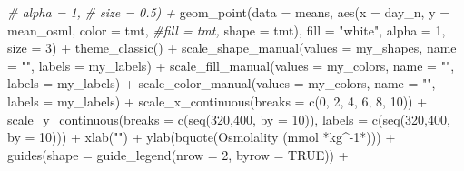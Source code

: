 \documentclass[
]{article}
\newenvironment{Shaded}{\begin{snugshade}}{\end{snugshade}}
\newcommand{\AttributeTok}[1]{\textcolor[rgb]{0.77,0.63,0.00}{#1}}
\newcommand{\CommentTok}[1]{\textcolor[rgb]{0.56,0.35,0.01}{\textit{#1}}}
\newcommand{\ConstantTok}[1]{\textcolor[rgb]{0.00,0.00,0.00}{#1}}
\newcommand{\DecValTok}[1]{\textcolor[rgb]{0.00,0.00,0.81}{#1}}
\newcommand{\FunctionTok}[1]{\textcolor[rgb]{0.00,0.00,0.00}{#1}}
\newcommand{\NormalTok}[1]{#1}
\newcommand{\SpecialCharTok}[1]{\textcolor[rgb]{0.00,0.00,0.00}{#1}}
\newcommand{\StringTok}[1]{\textcolor[rgb]{0.31,0.60,0.02}{#1}}
\begin{document}
\begin{Shaded}
\begin{Highlighting}[]
        \CommentTok{\#    alpha = 1, }
         \CommentTok{\#   size = 0.5) +}
  \FunctionTok{geom\_point}\NormalTok{(}\AttributeTok{data =}\NormalTok{ means,}
            \FunctionTok{aes}\NormalTok{(}\AttributeTok{x =}\NormalTok{ day\_n,}
                \AttributeTok{y =}\NormalTok{ mean\_osml, }
                \AttributeTok{color =}\NormalTok{ tmt,}
                \CommentTok{\#fill = tmt,}
                \AttributeTok{shape =}\NormalTok{ tmt),}
            \AttributeTok{fill =} \StringTok{"white"}\NormalTok{,}
            \AttributeTok{alpha =} \DecValTok{1}\NormalTok{, }
            \AttributeTok{size =} \DecValTok{3}\NormalTok{) }\SpecialCharTok{+}
  \FunctionTok{theme\_classic}\NormalTok{() }\SpecialCharTok{+} 
  \FunctionTok{scale\_shape\_manual}\NormalTok{(}\AttributeTok{values =}\NormalTok{ my\_shapes, }\AttributeTok{name =} \StringTok{""}\NormalTok{,}
                     \AttributeTok{labels =}\NormalTok{ my\_labels) }\SpecialCharTok{+}
  \FunctionTok{scale\_fill\_manual}\NormalTok{(}\AttributeTok{values =}\NormalTok{ my\_colors, }\AttributeTok{name =} \StringTok{""}\NormalTok{,}
                     \AttributeTok{labels =}\NormalTok{ my\_labels) }\SpecialCharTok{+}
  \FunctionTok{scale\_color\_manual}\NormalTok{(}\AttributeTok{values =}\NormalTok{ my\_colors, }\AttributeTok{name =} \StringTok{""}\NormalTok{,}
                     \AttributeTok{labels =}\NormalTok{ my\_labels) }\SpecialCharTok{+}
  \FunctionTok{scale\_x\_continuous}\NormalTok{(}\AttributeTok{breaks =} \FunctionTok{c}\NormalTok{(}\DecValTok{0}\NormalTok{, }\DecValTok{2}\NormalTok{, }\DecValTok{4}\NormalTok{, }\DecValTok{6}\NormalTok{, }\DecValTok{8}\NormalTok{, }\DecValTok{10}\NormalTok{)) }\SpecialCharTok{+}
  \FunctionTok{scale\_y\_continuous}\NormalTok{(}\AttributeTok{breaks =} \FunctionTok{c}\NormalTok{(}\FunctionTok{seq}\NormalTok{(}\DecValTok{320}\NormalTok{,}\DecValTok{400}\NormalTok{, }\AttributeTok{by =} \DecValTok{10}\NormalTok{)),}
                     \AttributeTok{labels =} \FunctionTok{c}\NormalTok{(}\FunctionTok{seq}\NormalTok{(}\DecValTok{320}\NormalTok{,}\DecValTok{400}\NormalTok{, }\AttributeTok{by =} \DecValTok{10}\NormalTok{))) }\SpecialCharTok{+}
  \FunctionTok{xlab}\NormalTok{(}\StringTok{""}\NormalTok{) }\SpecialCharTok{+} 
  \FunctionTok{ylab}\NormalTok{(}\FunctionTok{bquote}\NormalTok{(}\StringTok{\textquotesingle{}Osmolality (mmol \textquotesingle{}}\SpecialCharTok{*}\NormalTok{kg}\SpecialCharTok{\^{}{-}}\DecValTok{1}\SpecialCharTok{*}\StringTok{\textquotesingle{})\textquotesingle{}}\NormalTok{)) }\SpecialCharTok{+} 
  \FunctionTok{guides}\NormalTok{(}\AttributeTok{shape =} \FunctionTok{guide\_legend}\NormalTok{(}\AttributeTok{nrow =} \DecValTok{2}\NormalTok{, }\AttributeTok{byrow =} \ConstantTok{TRUE}\NormalTok{)) }\SpecialCharTok{+}

\end{Highlighting}
\end{Shaded}
\end{document}
